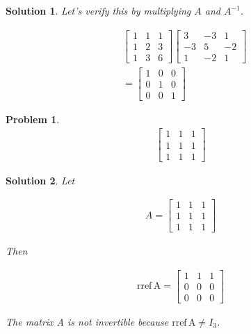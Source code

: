 \documentclass{article}
\newtheorem{problem}{Problem}
\newtheorem*{solution}{Solution}
\newcommand{\rref}[1]{\mathrm{rref \, #1}}
\begin{document}
\begin{solution}
Let's verify this by multiplying $A$ and $A^{-1}$.

\begin{align*}
& \begin{bmatrix}
1 & 1 & 1 \\
1 & 2 & 3 \\
1 & 3 & 6
\end{bmatrix}
\begin{bmatrix}
3 & -3 & 1 \\
-3 & 5 & -2 \\
1 & -2 & 1
\end{bmatrix} \\
&= \begin{bmatrix}
1 & 0 & 0 \\
0 & 1 & 0 \\
0 & 0 & 1
\end{bmatrix}
\end{align*}

\end{solution}

\begin{problem}
\begin{align*}
\begin{bmatrix}
1 & 1 & 1 \\
1 & 1 & 1 \\
1 & 1 & 1
\end{bmatrix}
\end{align*}
\end{problem}

\begin{solution}
Let

\begin{align*}
A = \begin{bmatrix}
1 & 1 & 1 \\
1 & 1 & 1 \\
1 & 1 & 1
\end{bmatrix}
\end{align*}

Then

\begin{align*}
\rref{A} = \begin{bmatrix}
1 & 1 & 1 \\
0 & 0 & 0 \\
0 & 0 & 0
\end{bmatrix}
\end{align*}

The matrix A is not invertible because $\rref{A} \neq I_{3}$.

\end{solution}
\end{document}
